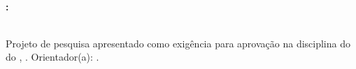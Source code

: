 \newpage
\thispagestyle{empty}
\begin{center}
    \MakeUppercase{\aluno\\}
    
    \vspace{3cm}
    
    \textbf{\MakeUppercase{\titulo}:}\\
    \vspace{0.3cm}
    {\normalsize \subtitulo}\\
    
    \vspace{2.5cm}
    
    \begin{flushright}
        \begin{minipage}{8cm}
            \singlespacing
            Projeto de pesquisa apresentado como exigência para aprovação na disciplina \disciplina do \curso  do \instituicao, \campus. Orientador(a): \orientador.
        \end{minipage}
    \end{flushright}
    
    \vfill
    
    \local\\
    \ano
\end{center}